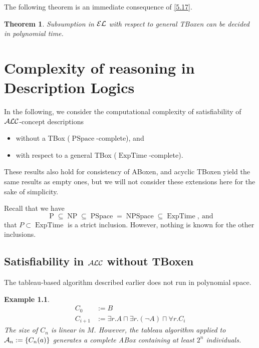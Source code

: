 \documentclass[openany]{scrbook}
\theoremstyle{break}
\newtheorem{Theorem}{Theorem}[chapter]
\newtheorem{NumberedExample}[Theorem]{Example}
\theoremstyle{nonumberbreak}
\theoremstyle{nonumberplain}
\theoremstyle{nonumberbreak}
\newcommand{\set}[1]{\left\{#1\right\}}
\newcommand{\ALC}{{\cal A}{\cal L}{\cal C}}
\newcommand{\EL}{{\cal E}{\cal L}}
\newcommand{\NP}{\operatorname{NP}}
\newcommand{\PSpace}{\operatorname{PSpace}}
\newcommand{\NPSpace}{\operatorname{NPSpace}}
\newcommand{\ExpTime}{\operatorname{ExpTime}}
\begin{document}
The following theorem is an immediate consequence of \cref{5.17}.

\begin{Theorem}
  \label{5.18}
  Subsumption in $\EL$ with respect to general TBoxen can be decided
  in polynomial time.
\end{Theorem}

\chapter{Complexity of reasoning in Description Logics}
In the following, we consider the computational complexity of
satisfiability of $\ALC$-concept descriptions
\begin{itemize}
\item without a TBox ($\PSpace$-complete), and
\item with respect to a general TBox ($\ExpTime$-complete).
\end{itemize}
These results also hold for consistency of ABoxen, and acyclic TBoxen
yield the same results as empty ones, but we will not consider these
extensions here for the sake of simplicity.

Recall that we have
\begin{equation*}
  \operatorname{P} \subseteq \NP \subseteq \PSpace = \NPSpace
  \subseteq \ExpTime,\ \text{and}
\end{equation*}
that $P \subset \ExpTime$ is a strict inclusion. However, nothing
is known for the other inclusions.

\section{Satisfiability in $\ALC$ without TBoxen}
The tableau-based algorithm described earlier does not run in
polynomial space.
\begin{NumberedExample}
  \label{6.1}
  \begin{align*}
    C_0 & := B \\
    C_{i + 1} &:= \exists r.A \sqcap  \exists r.(\neg A) \sqcap \forall
    r. C_i
  \end{align*}
  The size of $C_n$ is linear in $M$. However, the tableau algorithm
  applied to ${\cal A}_n := \set{C_n(a)}$ generates a complete ABox
  containing at least $2^n$ individuals.
\end{NumberedExample}
\end{document}
